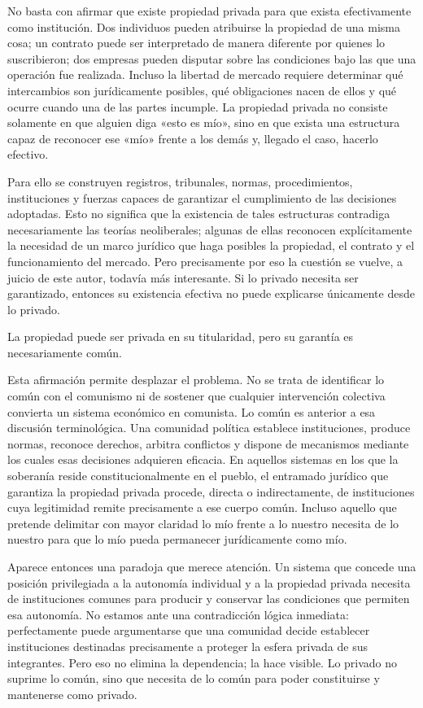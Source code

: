 \documentclass[12pt,a4paper]{article}
\begin{document}
No basta con afirmar que existe propiedad privada para que exista efectivamente como institución. Dos individuos pueden atribuirse la propiedad de una misma cosa; un contrato puede ser interpretado de manera diferente por quienes lo suscribieron; dos empresas pueden disputar sobre las condiciones bajo las que una operación fue realizada. Incluso la libertad de mercado requiere determinar qué intercambios son jurídicamente posibles, qué obligaciones nacen de ellos y qué ocurre cuando una de las partes incumple. La propiedad privada no consiste solamente en que alguien diga «esto es mío», sino en que exista una estructura capaz de reconocer ese «mío» frente a los demás y, llegado el caso, hacerlo efectivo.

Para ello se construyen registros, tribunales, normas, procedimientos, instituciones y fuerzas capaces de garantizar el cumplimiento de las decisiones adoptadas. Esto no significa que la existencia de tales estructuras contradiga necesariamente las teorías neoliberales; algunas de ellas reconocen explícitamente la necesidad de un marco jurídico que haga posibles la propiedad, el contrato y el funcionamiento del mercado. Pero precisamente por eso la cuestión se vuelve, a juicio de este autor, todavía más interesante. Si lo privado necesita ser garantizado, entonces su existencia efectiva no puede explicarse únicamente desde lo privado.

La propiedad puede ser privada en su titularidad, pero su garantía es necesariamente común.

Esta afirmación permite desplazar el problema. No se trata de identificar lo común con el comunismo ni de sostener que cualquier intervención colectiva convierta un sistema económico en comunista. Lo común es anterior a esa discusión terminológica. Una comunidad política establece instituciones, produce normas, reconoce derechos, arbitra conflictos y dispone de mecanismos mediante los cuales esas decisiones adquieren eficacia. En aquellos sistemas en los que la soberanía reside constitucionalmente en el pueblo, el entramado jurídico que garantiza la propiedad privada procede, directa o indirectamente, de instituciones cuya legitimidad remite precisamente a ese cuerpo común. Incluso aquello que pretende delimitar con mayor claridad lo mío frente a lo nuestro necesita de lo nuestro para que lo mío pueda permanecer jurídicamente como mío.

Aparece entonces una paradoja que merece atención. Un sistema que concede una posición privilegiada a la autonomía individual y a la propiedad privada necesita de instituciones comunes para producir y conservar las condiciones que permiten esa autonomía. No estamos ante una contradicción lógica inmediata: perfectamente puede argumentarse que una comunidad decide establecer instituciones destinadas precisamente a proteger la esfera privada de sus integrantes. Pero eso no elimina la dependencia; la hace visible. Lo privado no suprime lo común, sino que necesita de lo común para poder constituirse y mantenerse como privado.
\end{document}
